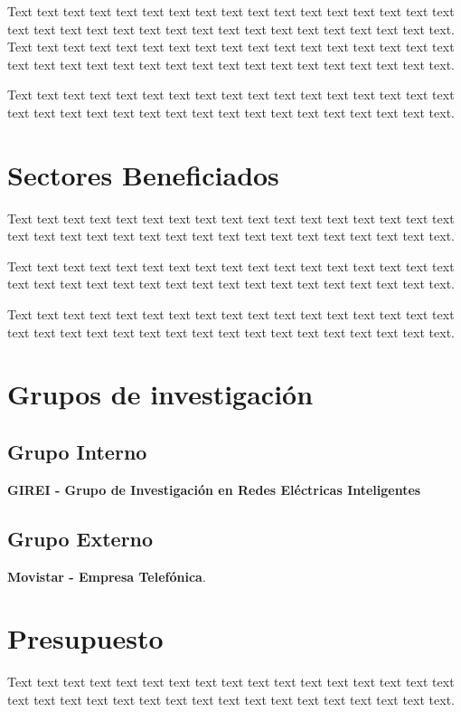 \documentclass[12pt,a4paper]{article}
\begin{document}
Text text text text text text text text text text text  text text text text text text text text text text text text text text text text text text text text text text text.
Text text text text text text text text text text text  text text text text text text text text text text text text text text text text text text text text text text text.

Text text text text text text text text text text text  text text text text text text text text text text text text text text text text text text text text text text text.
\section{Sectores Beneficiados}
Text text text text text text text text text text text  text text text text text text text text text text text text text text text text text text text text text text text.

Text text text text text text text text text text text  text text text text text text text text text text text text text text text text text text text text text text text.

Text text text text text text text text text text text  text text text text text text text text text text text text text text text text text text text text text text text.
\section{Grupos de investigación}
\subsection{Grupo Interno}

\textbf{GIREI - Grupo de Investigación en Redes Eléctricas Inteligentes}
\subsection{Grupo Externo}

\textbf{Movistar - Empresa Telefónica}. 
\section{Presupuesto}
Text text text text text text text text text text text  text text text text text text text text text text text text text text text text text text text text text text text.
\end{document}

